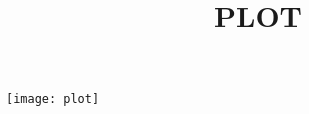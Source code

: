 \documentclass{article}
\begin{document}
\title{PLOT}
\maketitle
\texttt{[image: plot]}
\end{document}

